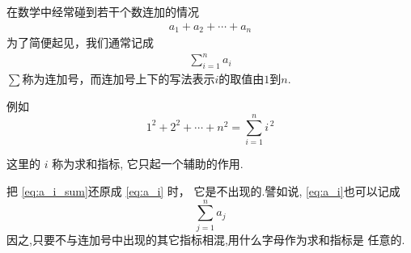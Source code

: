\documentclass[13pt,fontset=mac]{ctexbeamer}
\begin{document}
\begin{frame}
		\small{
	在数学中经常碰到若干个数连加的情况
	\begin{align}\label{eq:a_i}
		a_1+a_2+\cdots+a_n
	\end{align}
	为了简便起见，我们通常记成
	\begin{align}\label{eq:a_i_sum}
		\sum_{i=1}^{n}a_i
	\end{align}
	$\sum$称为\alert{连加号}，而连加号上下的写法表示$i$的取值由$1$到$n$.

	例如
	\[1^2+2^2+\cdots+n^2=\sum_{i=1}^{n}i^{\, 2}\]

	这里的 $i$ 称为\alert{求和指标}, 它只起一个辅助的作用.

	把 \eqref{eq:a_i_sum}还原成 \eqref{eq:a_i} 时，
	它是不出现的.譬如说, \eqref{eq:a_i}也可以记成
	$$
	\sum_{j=1}^{n} a_{j}
	$$
因之,只要不与连加号中出现的其它指标相混,用什么字母作为求和指标是
	任意的.}
\end{frame}
\end{document}
